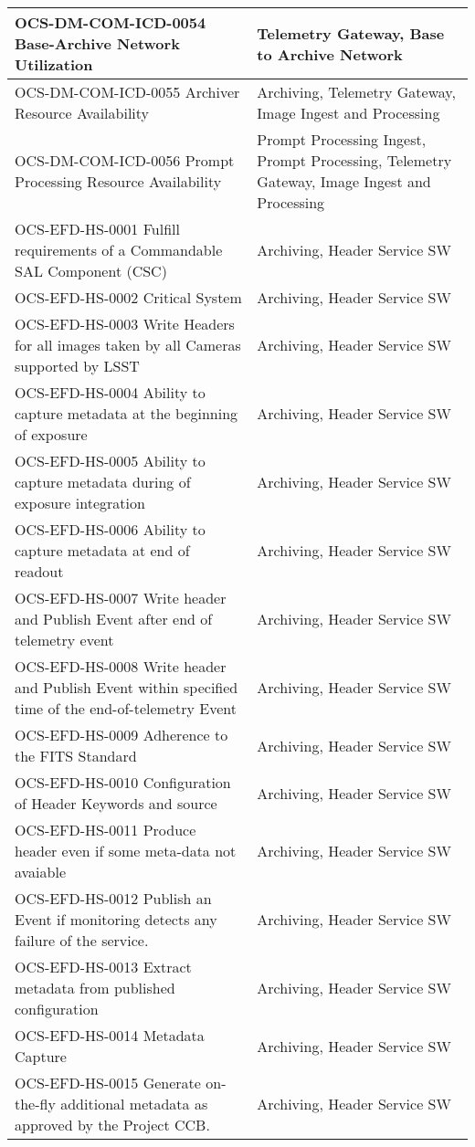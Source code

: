 \begin{longtable}{p{}p{}}
OCS-DM-COM-ICD-0054 Base-Archive Network Utilization & Telemetry Gateway, Base to Archive Network \\ \hline
OCS-DM-COM-ICD-0055 Archiver Resource Availability & Archiving, Telemetry Gateway, Image Ingest and Processing \\ \hline
OCS-DM-COM-ICD-0056 Prompt Processing Resource Availability & Prompt Processing Ingest, Prompt Processing, Telemetry Gateway, Image Ingest and Processing \\ \hline
OCS-EFD-HS-0001 Fulfill requirements of a Commandable SAL Component (CSC) & Archiving, Header Service SW \\ \hline
OCS-EFD-HS-0002 Critical System & Archiving, Header Service SW \\ \hline
OCS-EFD-HS-0003 Write Headers for all images taken by all Cameras supported by LSST & Archiving, Header Service SW \\ \hline
OCS-EFD-HS-0004 Ability to capture metadata at the beginning of exposure & Archiving, Header Service SW \\ \hline
OCS-EFD-HS-0005 Ability to capture metadata during of exposure integration & Archiving, Header Service SW \\ \hline
OCS-EFD-HS-0006 Ability to capture metadata at end of readout & Archiving, Header Service SW \\ \hline
OCS-EFD-HS-0007 Write header and Publish Event after end of telemetry event & Archiving, Header Service SW \\ \hline
OCS-EFD-HS-0008 Write header and Publish Event within specified time of the end-of-telemetry Event & Archiving, Header Service SW \\ \hline
OCS-EFD-HS-0009 Adherence to the FITS Standard & Archiving, Header Service SW \\ \hline
OCS-EFD-HS-0010 Configuration of Header Keywords and source & Archiving, Header Service SW \\ \hline
OCS-EFD-HS-0011 Produce header even if some meta-data not avaiable & Archiving, Header Service SW \\ \hline
OCS-EFD-HS-0012 Publish an Event if monitoring detects any failure of the service. & Archiving, Header Service SW \\ \hline
OCS-EFD-HS-0013 Extract metadata from published configuration & Archiving, Header Service SW \\ \hline
OCS-EFD-HS-0014 Metadata Capture & Archiving, Header Service SW \\ \hline
OCS-EFD-HS-0015 Generate on-the-fly additional metadata as approved by the Project CCB. & Archiving, Header Service SW \\ \hline

\end{longtable}
\normalsize

